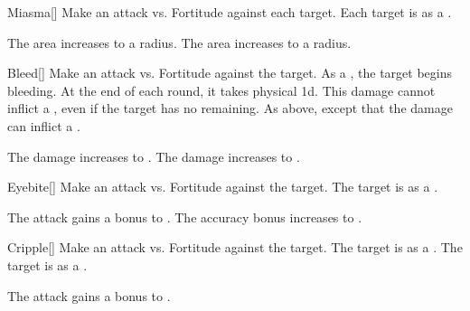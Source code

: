 \lowercase{\hypertarget{spell:Miasma}{}}\label{spell:Miasma}
\begin{freeability}[Rank 3]{\hypertarget{spell:Miasma}{Miasma}}[]
Make an attack vs. Fortitude against each target.
\hit Each target is  as a .

\rankline
{} The area increases to a \arealarge radius.
 The area increases to a \areahuge radius.
\end{freeability}
\vspace{0.25em}



\lowercase{\hypertarget{spell:Bleed}{}}\label{spell:Bleed}
\begin{freeability}[Rank 4]{\hypertarget{spell:Bleed}{Bleed}}[]
Make an attack vs. Fortitude against the target.
\hit As a , the target begins bleeding.
At the end of each round, it takes physical  \minus1d.
This damage cannot inflict a , even if the target has no  remaining.
\crit As above, except that the damage can inflict a .

\rankline
{} The damage increases to .
 The damage increases to  .
\end{freeability}
\vspace{0.25em}



\lowercase{\hypertarget{spell:Eyebite}{}}\label{spell:Eyebite}
\begin{freeability}[Rank 5]{\hypertarget{spell:Eyebite}{Eyebite}}[]
Make an attack vs. Fortitude against the target.
\hit The target is  as a .

\rankline
{} The attack gains a  bonus to .
 The accuracy bonus increases to .
\end{freeability}
\vspace{0.25em}



\lowercase{\hypertarget{spell:Cripple}{}}\label{spell:Cripple}
\begin{freeability}[Rank 6]{\hypertarget{spell:Cripple}{Cripple}}[]
Make an attack vs. Fortitude against the target.
\hit The target is  as a .
\crit The target is  as a .

\rankline
{} The attack gains a  bonus to .
\end{freeability}
\vspace{0.25em}



